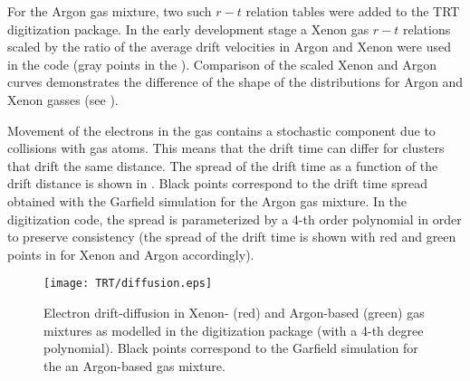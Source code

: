 For the Argon gas mixture, two such $r-t$ relation tables were added to the TRT digitization package.
In the early development stage a Xenon gas $r-t$ relations scaled by the ratio of the average drift velocities in Argon and Xenon were used in the code 
(gray points in the ). 
Comparison of the scaled Xenon and Argon curves demonstrates the difference of the shape of the distributions for Argon and Xenon gasses (see ).


Movement of the electrons in the gas contains a stochastic component due to collisions with gas atoms. 
This means that the drift time can differ for clusters that drift the same distance.
The spread of the drift time as a function of the drift distance is shown in .
Black points correspond to the drift time spread obtained with the Garfield simulation for the Argon gas mixture.
In the digitization code, the spread is parameterized by a 4-th order polynomial
in order to preserve consistency (the spread of the drift time is shown with red and green points in  for Xenon and Argon accordingly).

\begin{figure}[h]
\begin{center}
\texttt{[image: TRT/diffusion.eps]}
\caption{Electron drift-diffusion in Xenon- (red) and Argon-based (green) gas mixtures as modelled in the digitization package (with a 4-th degree polynomial). 
Black points correspond to the Garfield simulation for the an Argon-based gas mixture.}
\label{fig:diffusion}
\end{center}
\end{figure}


